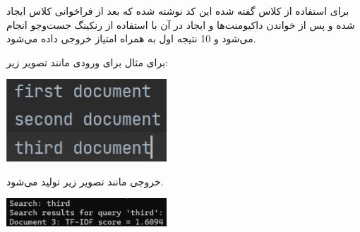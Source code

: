 \documentclass[12pt, dvipsnames, svgnames, x11names,]{article}
\begin{document}
		{\normalsize 
			برای استفاده از کلاس گفته شده این کد نوشته شده که بعد از فراخوانی کلاس ایجاد شده و پس از خواندن داکیومنت‌ها و ایجاد  در آن با استفاده از رنکینگ  جست‌و‌جو انجام می‌شود و 10 نتیجه اول به همراه امتیاز خروجی داده می‌شود.
		}		
	
		{\normalsize برای مثال برای ورودی مانند تصویر زیر:}
	
		\begin{center}
			{\includegraphics[width=6cm]{images/08.png}} \par
		\end{center}
	
		{\normalsize خروجی مانند تصویر زیر تولید می‌شود.}
	
		\begin{center}
			{\includegraphics[width=6cm]{images/09.png}} \par
		\end{center}
	
	
	
\end{document}
